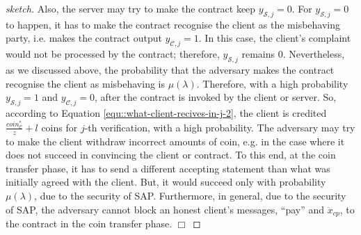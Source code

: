 \begin{proof}[sketch]
    
     
     Also, the server may try to make the contract keep $y_{\scriptscriptstyle \mathcal {S},j}=0$. For $y_{\scriptscriptstyle \mathcal {S},j}=0$ to happen, it has to make the contract  recognise the client as the misbehaving party, i.e. makes the contract output $y_{\scriptscriptstyle \mathcal {C},j}=1$. In this case, the client's complaint would not be processed by the contract; therefore,  $y_{\scriptscriptstyle \mathcal {S},j}$ remains $0$.   Nevertheless, as we discussed above, the probability that the adversary makes the contract  recognise the client as misbehaving is  $\mu(\lambda)$. Therefore, with a high probability  $y_{\scriptscriptstyle \mathcal {S},j}=1$ and $y_{\scriptscriptstyle \mathcal {C},j}=0$, after the contract  is invoked by the client or  server.  So, according to Equation \ref{equ::what-client-recives-in-j-2}, the client is credited $\frac{coin_{\scriptscriptstyle\mathcal C}^{\scriptscriptstyle*}}{z}+l$ coins for $j$-th verification, with a high probability. The adversary may  try to  make the client withdraw  incorrect amounts of coin, e.g. in the case where it does not succeed in convincing the client or contract. To this end,  at the coin transfer phase, it has to send a  different accepting statement  than what was initially agreed with the client. But, it would succeed only with  probability $\mu(\lambda)$, due to the security of SAP. Furthermore, in   general, due to the security of SAP, the adversary cannot block an honest client's  messages, ``pay'' and $\ddot{x}_{\scriptscriptstyle cp}$, to the contract in the coin transfer phase.
  \hfill\(\Box\)\end{proof}

